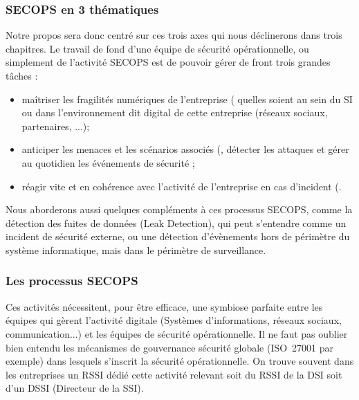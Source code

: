 \begin{frame}
\frametitle<presentation>{SECOPS en 3 thématiques}
Notre propos sera donc centré sur ces trois axes  qui nous déclinerons dans trois chapitres. Le travail de fond d'une équipe de sécurité opérationnelle, ou simplement de l'activité SECOPS est de pouvoir gérer de front trois grandes tâches : 
\begin{itemize}
 \item maîtriser les fragilités numériques de l'entreprise ( quelles soient au sein du SI ou dans l'environnement dit digital de cette entreprise (réseaux sociaux, partenaires, ...);
 \item anticiper les menaces et les scénarios associés (, détecter les attaques et gérer au quotidien les événements de sécurité ;
 \item réagir vite et en cohérence avec l'activité de l'entreprise en cas d'incident (.
\end{itemize}
\end{frame}

Nous aborderons aussi quelques compléments à ces processus SECOPS, comme la détection des fuites de données (Leak Detection), qui peut s'entendre comme un incident de sécurité externe, ou une détection d'évènements hors de périmètre du système informatique, mais dans le périmètre de surveillance.

\begin{frame}
\frametitle<presentation>{Les processus SECOPS}

\end{frame}

Ces activités nécessitent, pour être efficace, une symbiose parfaite entre les équipes qui gèrent l'activité digitale (Systèmes d'informations, réseaux sociaux,  communication...) et les équipes de sécurité opérationnelle.
Il ne faut pas oublier bien entendu les mécanismes de gouvernance sécurité globale (ISO~27001 par exemple) dans lesquels s'inscrit la sécurité opérationnelle. On trouve souvent dans les entreprises un RSSI dédié cette activité relevant soit du RSSI de la DSI soit d'un DSSI (Directeur de la SSI).

